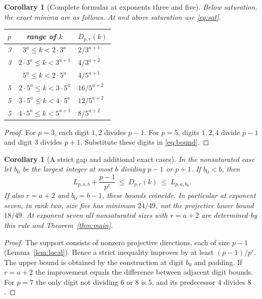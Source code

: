 \documentclass[11pt]{article}
\newtheorem{corollary}[theorem]{Corollary}
\theoremstyle{remark}\newtheorem{remark}[theorem]{Remark}
\begin{document}
\begin{corollary}[Complete formulas at exponents three and five]\label{cor:35}
Below saturation, the exact minima are as follows. At and above saturation use \eqref{eq:sat}.
\begin{center}
\begin{tabular}{ccl}
\toprule
$p$ & range of $k$ & $D_{p,r}(k)$\\
\midrule
3 & $3^a\le k<2\cdot3^a$ & $2/3^{a+1}$\\
3 & $2\cdot3^a\le k<3^{a+1}$ & $4/3^{a+2}$\\
\addlinespace
5 & $5^a\le k<2\cdot5^a$ & $4/5^{a+1}$\\
5 & $2\cdot5^a\le k<3\cdot5^a$ & $16/5^{a+2}$\\
5 & $3\cdot5^a\le k<4\cdot5^a$ & $12/5^{a+2}$\\
5 & $4\cdot5^a\le k<5^{a+1}$ & $8/5^{a+2}$\\
\bottomrule
\end{tabular}
\end{center}
\end{corollary}
\begin{proof}
For $p=3$, each digit $1,2$ divides $p-1$. For $p=5$, digits $1,2,4$ divide $p-1$ and digit $3$ divides $p+1$. Substitute these digits in \eqref{eq:bound}.
\end{proof}

\begin{corollary}[A strict gap and additional exact cases]\label{cor:gap}
In the nonsaturated case let $b_0$ be the largest integer at most $b$ dividing $p-1$ or $p+1$. If $b_0<b$, then
\[
 L_{p,a,b}+\frac{p-1}{p^r}\ \le\ D_{p,r}(k)\ \le\ L_{p,a,b_0}.
\]
If also $r=a+2$ and $b_0=b-1$, these bounds coincide. In particular at exponent seven, in rank two, size five has minimum $24/49$, not the projective lower bound $18/49$. At exponent seven all nonsaturated sizes with $r=a+2$ are determined by this rule and Theorem~\ref{thm:main}.
\end{corollary}
\begin{proof}
The support consists of nonzero projective directions, each of size $p-1$ (Lemma~\ref{lem:local}). Hence a strict inequality improves by at least $(p-1)/p^r$. The upper bound is obtained by the construction at digit $b_0$ and padding. If $r=a+2$ the improvement equals the difference between adjacent digit bounds. For $p=7$ the only digit not dividing $6$ or $8$ is $5$, and its predecessor $4$ divides $8$.
\end{proof}
\end{document}
